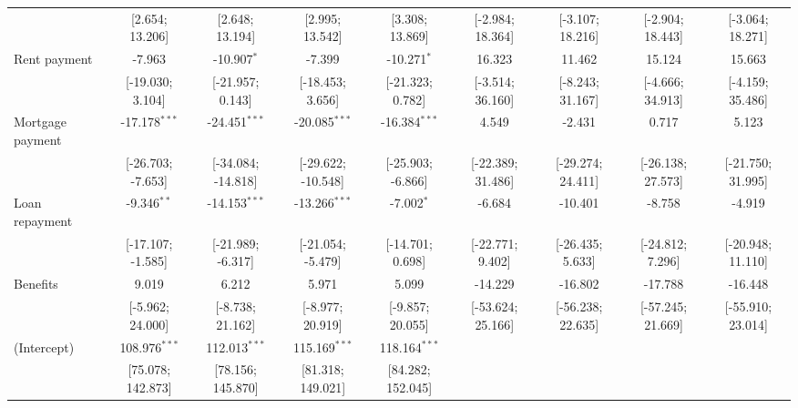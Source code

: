 \begin{table}[htbp]
\begin{threeparttable}[b]
\begin{tabular}{lcccccccc}
                                & [2.654; 13.206]   & [2.648; 13.194]    & [2.995; 13.542]    & [3.308; 13.869]   & [-2.984; 18.364]    & [-3.107; 18.216]    & [-2.904; 18.443]    & [-3.064; 18.271]\\   
         Rent payment           & -7.963            & -10.907$^{*}$      & -7.399             & -10.271$^{*}$     & 16.323              & 11.462              & 15.124              & 15.663\\   
                                & [-19.030; 3.104]  & [-21.957; 0.143]   & [-18.453; 3.656]   & [-21.323; 0.782]  & [-3.514; 36.160]    & [-8.243; 31.167]    & [-4.666; 34.913]    & [-4.159; 35.486]\\   
         Mortgage payment       & -17.178$^{***}$   & -24.451$^{***}$    & -20.085$^{***}$    & -16.384$^{***}$   & 4.549               & -2.431              & 0.717               & 5.123\\   
                                & [-26.703; -7.653] & [-34.084; -14.818] & [-29.622; -10.548] & [-25.903; -6.866] & [-22.389; 31.486]   & [-29.274; 24.411]   & [-26.138; 27.573]   & [-21.750; 31.995]\\   
         Loan repayment         & -9.346$^{**}$     & -14.153$^{***}$    & -13.266$^{***}$    & -7.002$^{*}$      & -6.684              & -10.401             & -8.758              & -4.919\\   
                                & [-17.107; -1.585] & [-21.989; -6.317]  & [-21.054; -5.479]  & [-14.701; 0.698]  & [-22.771; 9.402]    & [-26.435; 5.633]    & [-24.812; 7.296]    & [-20.948; 11.110]\\   
         Benefits               & 9.019             & 6.212              & 5.971              & 5.099             & -14.229             & -16.802             & -17.788             & -16.448\\   
                                & [-5.962; 24.000]  & [-8.738; 21.162]   & [-8.977; 20.919]   & [-9.857; 20.055]  & [-53.624; 25.166]   & [-56.238; 22.635]   & [-57.245; 21.669]   & [-55.910; 23.014]\\   
         (Intercept)            & 108.976$^{***}$   & 112.013$^{***}$    & 115.169$^{***}$    & 118.164$^{***}$   &                     &                     &                     &   \\   
                                & [75.078; 142.873] & [78.156; 145.870]  & [81.318; 149.021]  & [84.282; 152.045] &                     &                     &                     &   \\   

\end{tabular}
\end{threeparttable}
\end{table}

